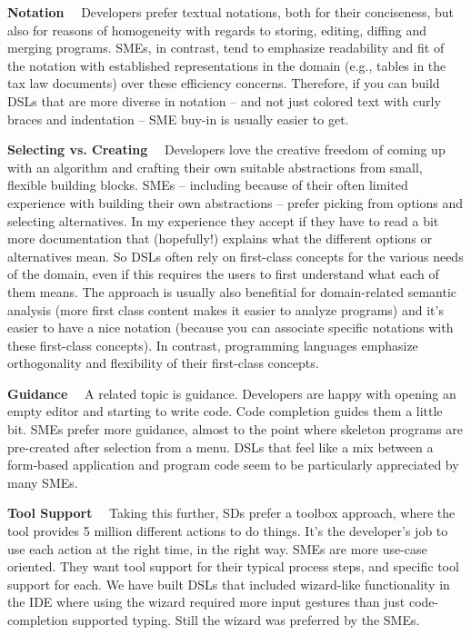 \documentclass[runningheads]{llncs}
\newcommand\parhead[1]{\vspace{1mm}\noindent\textbf{{#1}}\ \ }
\begin{document}
\parhead{Notation} Developers prefer textual notations, both for their
conciseness, but also for reasons of homogeneity with regards to storing,
editing, diffing and merging programs. SMEs, in contrast, tend to emphasize
readability and fit of the notation with established representations in the
domain (e.g., tables in the tax law documents) over these efficiency concerns.
Therefore, if you can build DSLs that are more diverse in notation -- and not
just colored text with curly braces and indentation -- SME buy-in is usually
easier to get.

\parhead{Selecting vs. Creating} Developers love the creative freedom of coming
up with an algorithm and crafting their own suitable abstractions from small,
flexible building blocks. SMEs -- including because of their often limited
experience with building their own abstractions -- prefer picking from options
and selecting alternatives.
In my experience they accept if they have to read a bit more documentation that
(hopefully!) explains what the different options or alternatives mean.
So DSLs often rely on first-class concepts for the various needs of the domain,
even if this requires the users to first understand what each of them means.
The approach is usually also benefitial for domain-related semantic analysis
(more first class content makes it easier to analyze programs) and it's easier
to have a nice notation (because you can associate specific notations with these
first-class concepts). In contrast, programming languages emphasize
orthogonality and flexibility of their first-class concepts.

\parhead{Guidance} A related topic is guidance. Developers are happy with
opening an empty editor and starting to write code. Code completion guides
them a little bit. SMEs prefer more guidance, almost to the point where 
skeleton programs are pre-created after selection from a menu. DSLs that feel
like a mix between a form-based application and program code seem to be 
particularly appreciated by many SMEs. 

\parhead{Tool Support} Taking this further, SDs prefer a toolbox approach, where
the tool provides 5 million different actions to do things. It's the
developer's job to use each action at the right time, in the right way.
SMEs are more use-case oriented. They want tool support for their typical
process steps, and specific tool support for each. We have built DSLs that
included wizard-like functionality in the IDE where using the wizard required
more input gestures than just code-completion supported typing. Still the wizard
was preferred by the SMEs.
 
\end{document}
